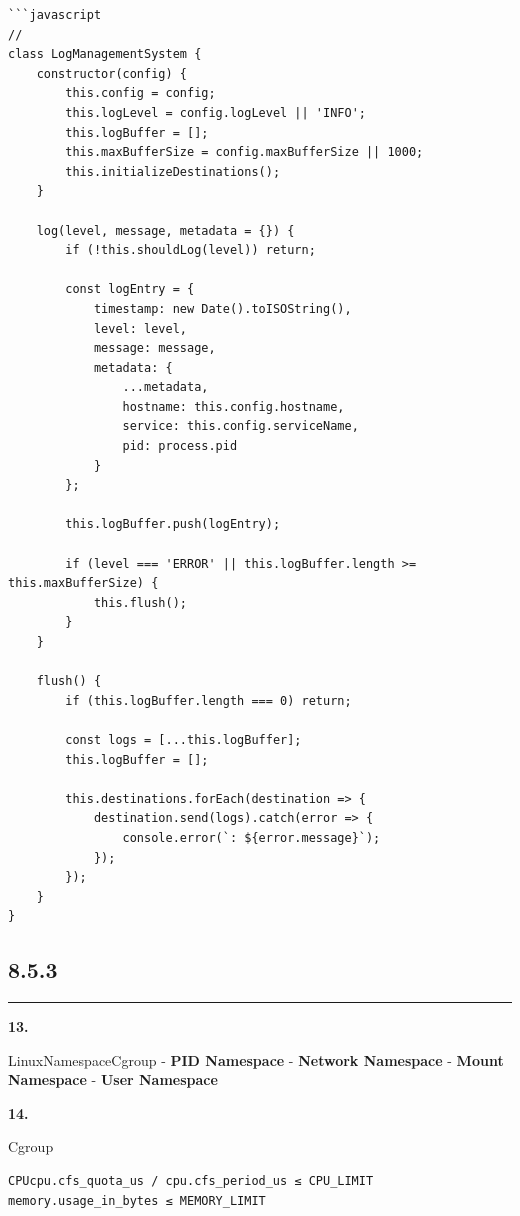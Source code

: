 \begin{verbatim}
```javascript
// 
class LogManagementSystem {
    constructor(config) {
        this.config = config;
        this.logLevel = config.logLevel || 'INFO';
        this.logBuffer = [];
        this.maxBufferSize = config.maxBufferSize || 1000;
        this.initializeDestinations();
    }
    
    log(level, message, metadata = {}) {
        if (!this.shouldLog(level)) return;
        
        const logEntry = {
            timestamp: new Date().toISOString(),
            level: level,
            message: message,
            metadata: {
                ...metadata,
                hostname: this.config.hostname,
                service: this.config.serviceName,
                pid: process.pid
            }
        };
        
        this.logBuffer.push(logEntry);
        
        if (level === 'ERROR' || this.logBuffer.length >= this.maxBufferSize) {
            this.flush();
        }
    }
    
    flush() {
        if (this.logBuffer.length === 0) return;
        
        const logs = [...this.logBuffer];
        this.logBuffer = [];
        
        this.destinations.forEach(destination => {
            destination.send(logs).catch(error => {
                console.error(`: ${error.message}`);
            });
        });
    }
}
\end{verbatim}

\subsection{8.5.3}\label{section-68}

\begin{center}\rule{0.5\linewidth}{0.5pt}\end{center}

\textbf{13. }

LinuxNamespaceCgroup - \textbf{PID Namespace} - \textbf{Network
Namespace} - \textbf{Mount Namespace} - \textbf{User Namespace}

\textbf{14. }

Cgroup

\begin{verbatim}
CPUcpu.cfs_quota_us / cpu.cfs_period_us ≤ CPU_LIMIT
memory.usage_in_bytes ≤ MEMORY_LIMIT
\end{verbatim}

